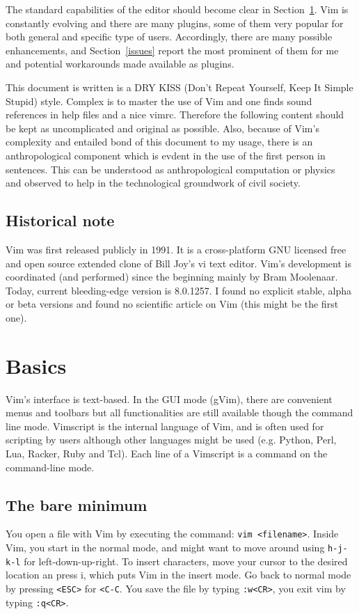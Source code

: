 \documentclass{article}
\begin{document}
The standard capabilities of the editor
should become clear in Section~\ref{basics}.
Vim is constantly evolving and there are many plugins,
some of them very popular for both general and specific
type of users.
Accordingly, there are many possible enhancements,
and Section~\ref{issues} report the most prominent of them
for me and potential workarounds made available as plugins.

This document is written is a DRY KISS
(Don't Repeat Yourself, Keep It Simple Stupid) style.
Complex is to master the use of Vim
and one finds sound
references in help files and a nice vimrc.
Therefore the following content should be kept
as uncomplicated and original as possible.
Also, because of Vim's complexity and entailed
bond of this document to my usage,
there is an anthropological component
which is evdent in the use of the first person
in sentences.
This can be understood as anthropological computation
or physics~\cite{anPh,anPh2} and observed to help
in the technological groundwork of civil society.


\subsection{Historical note}
Vim was first released publicly in 1991.
It is a cross-platform GNU licensed free and open source extended clone of Bill Joy's vi text editor.
Vim's development is coordinated (and performed) since the beginning
mainly by Bram Moolenaar.
Today, current bleeding-edge version is 8.0.1257.
I found no explicit stable, alpha or beta versions
and found no scientific article on Vim 
(this might be the first one).

\section{Basics}\label{basics}
Vim's interface is text-based.
In the GUI mode (gVim),
there are convenient menus and toolbars
but all functionalities are still available though
the command line mode.
Vimscript is the internal language of Vim,
and is often used for scripting by users
although other languages might be used 
(e.g. Python, Perl, Lua, Racker, Ruby and Tcl). 
Each line of a Vimscript is a command on the
command-line mode.

\subsection{The bare minimum}\label{minimum}
You open a file with Vim by executing
the command: \texttt{vim <filename>}.
Inside Vim, you start in the normal
mode, and might want to move around using
\texttt{h-j-k-l} for left-down-up-right.
To insert characters, move your
cursor to the desired location an press i,
which puts Vim in the insert mode.
Go back to normal mode by pressing
\texttt{<ESC>} for \texttt{<C-C}.
You save the file by typing \texttt{:w<CR>},
you exit vim by typing \texttt{:q<CR>}.
\end{document}
